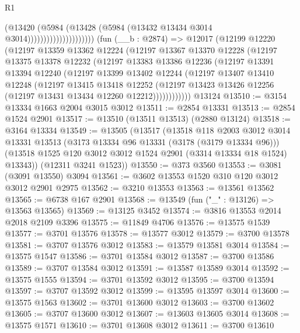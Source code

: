 \begin{lexlean}{R1}
\begin{coremodule}
                                    (@13420
                                      (@5984
                                        (@13428
                                          (@5984 (@13432 @13434 @3014 @3014)))))))))))))))))))))
    (fun (__b : @2874) =>
    @12017
      (@12199
        @12220
        (@12197
          @13359
          @13362
          @12224
          (@12197
            @13367
            @13370
            @12228
            (@12197
              @13375
              @13378
              @12232
              (@12197
                @13383
                @13386
                @12236
                (@12197
                  @13391
                  @13394
                  @12240
                  (@12197
                    @13399
                    @13402
                    @12244
                    (@12197
                      @13407
                      @13410
                      @12248
                      (@12197
                        @13415
                        @13418
                        @12252
                        (@12197 @13423 @13426 @12256 (@12197 @13431 @13434 @12260 @12212))))))))))))
    @13124
@13510 := @3154 @13334 @1663 @2004 @3015 @3012
@13511 := @2854 @13331
@13513 := @2854 @1524 @2901
@13517 := @13510 (@13511 @13513) (@2880 @13124)
@13518 := @3164 @13334
@13549 := @13505
    (@13517
      (@13518
        @118
        @2003
        @3012
        @3014
        @13331
        @13513
        (@3173 @13334 @96 @13331 (@3178 (@3179 @13334 @96)))
        (@13518 @1525 @120 @3012 @3012 @1524 @2901 (@3314 @13334 @18 @1524) @13343))
      (@12311 @3241 @1523))
@13550 := @373 @3560
@13553 := @3081 (@3091 @13550) @3094
@13561 := @3602 @13553 @1520 @310 @120 @3012 @3012 @2901 @2975
@13562 := @3210 @13553
@13563 := @13561 @13562
@13565 := @6738 @167 @2901
@13568 := @13549 (fun ("_" : @13126) => @13563 @13565)
@13569 := @13125 @3452
@13574 := @3816 @13553 @2014 @2018 @2109 @3396
@13575 := @11849 @4706
@13576 := @13575 @1539
@13577 := @3701 @13576
@13578 := @13577 @3012
@13579 := @3700 @13578
@13581 := @3707 @13576 @3012
@13583 := @13579 @13581 @3014
@13584 := @13575 @1547
@13586 := @3701 @13584 @3012
@13587 := @3700 @13586
@13589 := @3707 @13584 @3012
@13591 := @13587 @13589 @3014
@13592 := @13575 @1555
@13594 := @3701 @13592 @3012
@13595 := @3700 @13594
@13597 := @3707 @13592 @3012
@13599 := @13595 @13597 @3014
@13600 := @13575 @1563
@13602 := @3701 @13600 @3012
@13603 := @3700 @13602
@13605 := @3707 @13600 @3012
@13607 := @13603 @13605 @3014
@13608 := @13575 @1571
@13610 := @3701 @13608 @3012
@13611 := @3700 @13610

\end{coremodule}
\end{lexlean}
